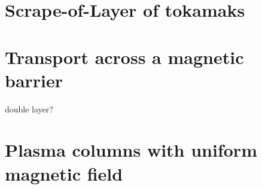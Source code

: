 
	\section{Scrape-of-Layer of tokamaks}
	\section{Transport across a magnetic barrier}
		double layer?
	\section{Plasma columns with uniform magnetic field}
	
